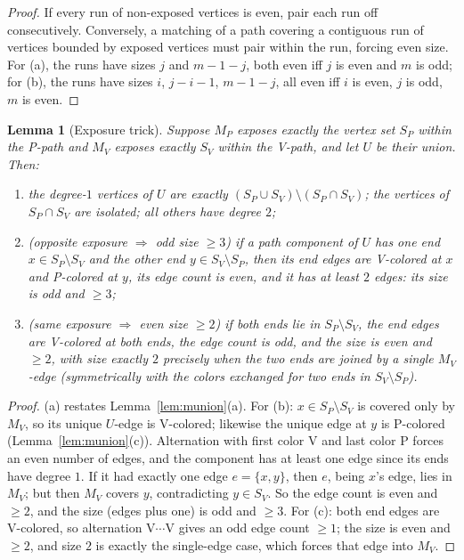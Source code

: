 \documentclass[11pt]{article}
\newtheorem{lemma}[theorem]{Lemma}
\theoremstyle{definition}
\begin{document}
\begin{proof}
If every run of non-exposed vertices is even, pair each run off consecutively.
Conversely, a matching of a path covering a contiguous run of vertices bounded by
exposed vertices must pair within the run, forcing even size. For (a), the runs have
sizes $j$ and $m-1-j$, both even iff $j$ is even and $m$ is odd; for (b), the runs
have sizes $i$, $j-i-1$, $m-1-j$, all even iff $i$ is even, $j$ is odd, $m$ is even.
\end{proof}

\begin{lemma}[Exposure trick]\label{lem:trick}
Suppose $M_P$ exposes exactly the vertex set $S_P$ within the P-path and $M_V$ exposes
exactly $S_V$ within the V-path, and let $U$ be their union. Then:
\begin{enumerate}
\item[(a)] the degree-$1$ vertices of $U$ are exactly
$(S_P \cup S_V) \setminus (S_P \cap S_V)$; the vertices of $S_P \cap S_V$ are isolated;
all others have degree $2$;
\item[(b)] \emph{(opposite exposure $\Rightarrow$ odd size $\ge 3$)} if a path
component of $U$ has one end $x \in S_P \setminus S_V$ and the other end
$y \in S_V \setminus S_P$, then its end edges are V-colored at $x$ and P-colored at
$y$, its edge count is even, and it has at least $2$ edges: its size is odd and
$\ge 3$;
\item[(c)] \emph{(same exposure $\Rightarrow$ even size $\ge 2$)} if both ends lie in
$S_P \setminus S_V$, the end edges are V-colored at both ends, the edge count is odd,
and the size is even and $\ge 2$, with size exactly $2$ precisely when the two ends are
joined by a single $M_V$-edge (symmetrically with the colors exchanged for two ends in
$S_V \setminus S_P$).
\end{enumerate}
\end{lemma}

\begin{proof}
(a) restates Lemma~\ref{lem:munion}(a). For (b): $x \in S_P \setminus S_V$ is covered
only by $M_V$, so its unique $U$-edge is V-colored; likewise the unique edge at $y$ is
P-colored (Lemma~\ref{lem:munion}(c)). Alternation with first color V and last color P
forces an even number of edges, and the component has at least one edge since its ends
have degree $1$. If it had exactly one edge $e = \{x,y\}$, then $e$, being $x$'s edge,
lies in $M_V$; but then $M_V$ covers $y$, contradicting $y \in S_V$. So the edge count
is even and $\ge 2$, and the size (edges plus one) is odd and $\ge 3$. For (c): both
end edges are V-colored, so alternation $\mathrm V \cdots \mathrm V$ gives an odd edge
count $\ge 1$; the size is even and $\ge 2$, and size $2$ is exactly the single-edge
case, which forces that edge into $M_V$.
\end{proof}
\end{document}
